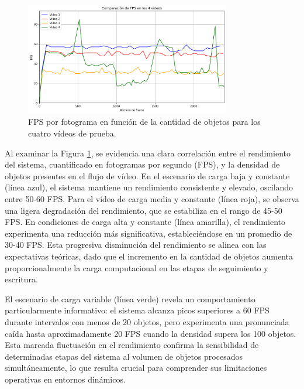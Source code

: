 \documentclass[11pt,spanish,listoffigures,listoftables]{tfgetsinf}
\begin{document}
\begin{figure}[H]
   \centering
   \includegraphics[width=0.8\textwidth]{excels/inferencia/cantidad_objetos/resultados/max_fps_4_videos/fps_comparison.png}
   \caption{FPS por fotograma en función de la cantidad de objetos para los cuatro vídeos de prueba.}
   \label{fig:fps_por_frame}
\end{figure}

Al examinar la Figura \ref{fig:fps_por_frame}, se evidencia una clara correlación entre el rendimiento del sistema, cuantificado en fotogramas por segundo (FPS), y la densidad de objetos presentes en el flujo de vídeo. En el escenario de carga baja y constante (línea azul), el sistema mantiene un rendimiento consistente y elevado, oscilando entre 50-60 FPS. Para el vídeo de carga media y constante (línea roja), se observa una ligera degradación del rendimiento, que se estabiliza en el rango de 45-50 FPS. En condiciones de carga alta y constante (línea amarilla), el rendimiento experimenta una reducción más significativa, estableciéndose en un promedio de 30-40 FPS. Esta progresiva disminución del rendimiento se alinea con las expectativas teóricas, dado que el incremento en la cantidad de objetos aumenta proporcionalmente la carga computacional en las etapas de seguimiento y escritura.

El escenario de carga variable (línea verde) revela un comportamiento particularmente informativo: el sistema alcanza picos superiores a 60 FPS durante intervalos con menos de 20 objetos, pero experimenta una pronunciada caída hasta aproximadamente 20 FPS cuando la densidad supera los 100 objetos. Esta marcada fluctuación en el rendimiento confirma la sensibilidad de determinadas etapas del sistema al volumen de objetos procesados simultáneamente, lo que resulta crucial para comprender sus limitaciones operativas en entornos dinámicos.
\end{document}
